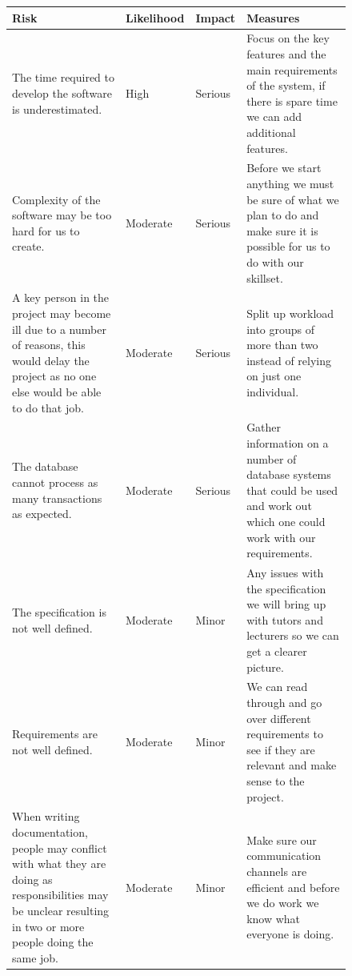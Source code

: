 \documentclass[10pt, notitlepage]{report}
\begin{document}
\begin{figure}[!h]

\begin{longtable}{| p{5.5cm} | p{2cm} | p{2cm} |  p{5.5cm} |}
\hline
\textbf{Risk} & \textbf{Likelihood} & \textbf{Impact} & \textbf{Measures} \\
\hline
\endfirsthead

\endlastfoot

\multicolumn{4}{c}{\textit{Continued from last page}}
\endhead

\multicolumn{4}{c}{\textit{Continued on next page}}
\endfoot

The time required to develop the software is underestimated. & 
High & 
Serious & 
Focus on the key features and the main requirements of the system, if there is spare time we can add additional features. \\ 
\hline
Complexity of the software may be too hard for us to create.&
Moderate&
Serious&
Before we start anything we must be sure of what we plan to do and make sure it is possible for us to do with our skillset.\\
\hline

A key person in the project may become ill due to a number of reasons, this would delay the project as no one else would be able to do that job.&
Moderate&
Serious&
Split up workload into groups of more than two instead of relying on just one individual.\\
\hline


The database cannot process as many transactions as expected.& 
Moderate&
Serious&
Gather information on a number of database systems that could be used and work out which one could work with our requirements.\\
\hline

The specification is not well defined.& 
Moderate&
Minor&
Any issues with the specification we will bring up with tutors and lecturers so we can get a clearer picture.\\
\hline


Requirements are not well defined.& 
Moderate&
Minor&
We can read through and go over different requirements to see  if they are relevant and make sense to the project.\\
\hline

When writing documentation, people may conflict with what they are doing as responsibilities may be unclear resulting in two or more people doing the same job.& 
Moderate&
Minor&
Make sure our communication channels are efficient and before we do work we know what everyone is doing.\\
\hline


\end{longtable}
\end{figure}
\end{document}
